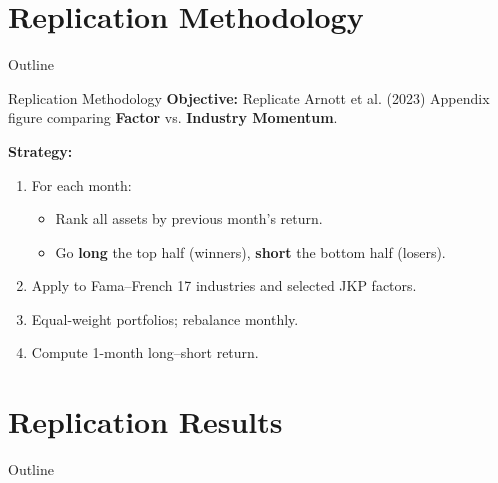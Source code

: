 \documentclass[t]{beamer}
\begin{document}
\section{Replication Methodology}

\begin{frame}{Outline}
\end{frame}

\begin{frame}{Replication Methodology}
\textbf{Objective:} Replicate Arnott et al. (2023) Appendix figure comparing \textbf{Factor} vs. \textbf{Industry Momentum}.

\textbf{Strategy:}
\begin{enumerate}
    \item For each month:
    \begin{itemize}
        \item Rank all assets by previous month’s return.
        \item Go \textbf{long} the top half (winners), \textbf{short} the bottom half (losers).
    \end{itemize}
    \item Apply to Fama–French 17 industries and selected JKP factors.
    \item Equal-weight portfolios; rebalance monthly.
    \item Compute 1-month long–short return.
\end{enumerate}
\end{frame}

\section{Replication Results}

\begin{frame}{Outline}
\end{frame}
\end{document}
